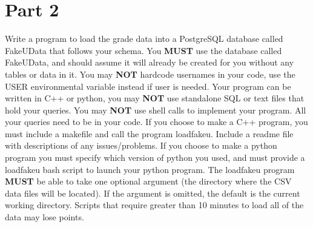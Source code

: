 \documentclass{article}
\begin{document}
\section*{Part 2} 
Write a program to load the grade data into a PostgreSQL database called FakeUData that follows your schema.
You {\bf MUST} use the database called FakeUData, and should assume it will already be created for you without any tables or data in it.
You may {\bf NOT} hardcode usernames in your code, use the USER environmental variable instead if user is needed.
Your program can be written in C++ or python, you may {\bf NOT} use standalone SQL or text files that hold your queries. 
You may {\bf NOT} use shell calls to implement your program.
All your queries need to be in your code. 
If you choose to make a C++ program, you must include a makefile and call the program loadfakeu. 
Include a readme file with descriptions of any issues/problems. 
If you choose to make a python program you must specify which version of python you used, and must provide a loadfakeu bash script to launch your python program.
The loadfakeu program {\bf MUST} be able to take one optional argument (the directory where the CSV data files will be located). 
If the argument is omitted, the default is the current working directory.
Scripts that require greater than 10 minutes to load all of the data may lose points. 
\clearpage
\end{document}
